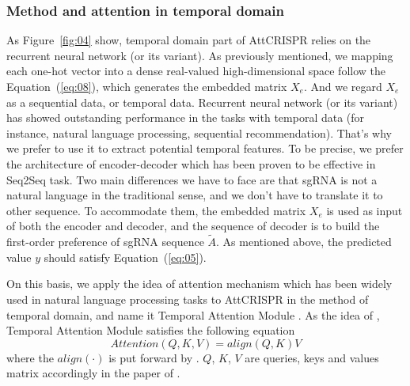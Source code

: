 \documentclass{bioinfo}
\begin{document}
\subsubsection{Method and attention in temporal domain}
As Figure~\ref{fig:04} show, temporal domain part of AttCRISPR relies on the recurrent neural network (or its variant). 
As previously mentioned, we mapping each one-hot vector into a dense real-valued high-dimensional space follow the Equation~(\ref{eq:08}), which generates the embedded matrix $X_e$.
And we regard $X_{e}$ as a sequential data, or temporal data.
Recurrent neural network (or its variant) has showed outstanding performance in the tasks with temporal data (for instance, natural language processing, sequential recommendation). 
That's why we prefer to use it to extract potential temporal features. 
To be precise, we prefer the architecture of encoder-decoder which has been proven to be effective in Seq2Seq task. 
Two main differences we have to face are that sgRNA is not a natural language in the traditional sense, and we don't have to translate it to other sequence. 
To accommodate them, the embedded matrix $X_e$ is used as input of both the encoder and decoder, and the sequence of decoder is to build the first-order preference of sgRNA sequence $\tilde{A}$. 
As mentioned above, the predicted value $y$ should satisfy Equation~(\ref{eq:05}). 

On this basis, we apply the idea of attention mechanism which has been widely used in natural language processing tasks to AttCRISPR in the method of temporal domain, 
and name it Temporal Attention Module \citep{vaswani2017attention,luong2015effective}.
As the idea of \citeauthor{vaswani2017attention}, Temporal Attention Module satisfies the following equation
\begin{equation}
Attention(Q,K,V)=align(Q,K)V\label{eq:13}
\end{equation}
where the $align(\cdot)$ is put forward by \citeauthor{luong2015effective}. 
$Q$, $K$, $V$ are queries, keys and values matrix accordingly in the paper of \citeauthor{vaswani2017attention}. 
\end{document}
